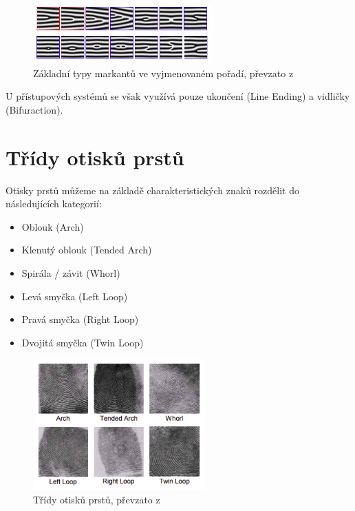 \begin{figure}[htbp]
    \centering
    \includegraphics[width=260px]{obrazky-figures/markants.png}
    \caption{Základní typy markantů ve vyjmenovaném pořadí, převzato z \cite{Drahansky}}
\end{figure}

U přístupových systémů se však využívá pouze ukončení (Line Ending) a vidličky (Bifuraction).\cite{Drahansky}

\section{Třídy otisků prstů}
Otisky prstů můžeme na základě charakteristických znaků rozdělit do následujících kategorií:\cite{Drahansky}
\begin{itemize}
    \item Oblouk (Arch)
    \item Klenutý oblouk (Tended Arch)
    \item Spirála / závit (Whorl)
    \item Levá smyčka (Left Loop)
    \item Pravá smyčka (Right Loop)
    \item Dvojitá smyčka (Twin Loop)
\end{itemize}

\begin{figure}[htbp]
    \centering
    \includegraphics[width=250px]{obrazky-figures/classes.png}
    \caption{Třídy otisků prstů, převzato z \cite{Drahansky}}
\end{figure}

